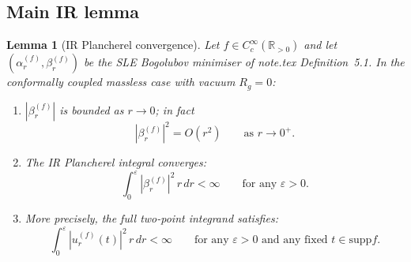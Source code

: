 \documentclass[12pt, a4paper]{article}
\newtheorem{lemma}[theorem]{Lemma}
\theoremstyle{remark}
\newcommand{\bR}{\mathbb{R}}
\newcommand{\supp}{\mathrm{supp}}
\begin{document}
\subsection{Main IR lemma}

\begin{lemma}[IR Plancherel convergence]\label{lem:IR}
  Let $f \in C_c^\infty(\bR_{>0})$ and let $(\alpha_r^{(f)}, \beta_r^{(f)})$
  be the SLE Bogolubov minimiser of note.tex Definition~5.1.
  In the conformally coupled massless case with vacuum $R_g = 0$:
  \begin{enumerate}
    \item[(a)] $|\beta_r^{(f)}|$ is bounded as $r \to 0$; in fact
      \begin{equation}\label{eq:beta-IR}
        |\beta_r^{(f)}|^2 = O(r^2) \qquad \text{as } r \to 0^+.
      \end{equation}
    \item[(b)] The IR Plancherel integral converges:
      \begin{equation}\label{eq:IR-convergence}
        \int_0^\varepsilon |\beta_r^{(f)}|^2\,r\,dr < \infty
        \qquad \text{for any } \varepsilon > 0.
      \end{equation}
    \item[(c)] More precisely, the full two-point integrand satisfies:
      \begin{equation}
        \int_0^\varepsilon |u_r^{(f)}(t)|^2\,r\,dr < \infty
        \qquad \text{for any } \varepsilon > 0 \text{ and any fixed } t \in \supp f.
      \end{equation}
  \end{enumerate}
\end{lemma}
\end{document}
